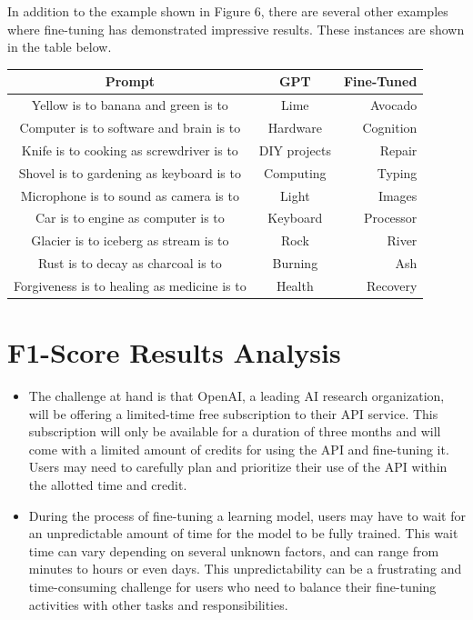 \documentclass[a0,landscape]{a0poster}
\begin{document}
\begin{multicols}{4}
In addition to the example shown in Figure 6, there are several other examples where fine-tuning has demonstrated impressive results. These instances are shown in the table below.

 \begin{center}\vspace{1cm}
\centering
\begin{tabular}{c|c|r}
\toprule
\textbf{Prompt}  &  \textbf{GPT}  & \textbf{Fine-Tuned} \\
\midrule
Yellow is to banana and green is to  &    Lime  & Avocado\\ \hline
Computer is to software and brain is to   &   Hardware   & Cognition\\ \hline
Knife is to cooking as screwdriver is to  &   DIY projects  & Repair \\ \hline
Shovel is to gardening as keyboard is to &   Computing   & Typing\\ \hline
Microphone is to sound as camera is to &    Light  & Images\\ \hline
Car is to engine as computer is to &   Keyboard   & Processor\\ \hline
Glacier is to iceberg as stream is to &   Rock   & River \\ \hline
Rust is to decay as charcoal is to &   Burning   & Ash\\ \hline
Forgiveness is to healing as medicine is to &   Health    & Recovery \\ \hline
\bottomrule
\end{tabular}
\end{center}\vspace{1cm}

\color{Teal}
\section*{F1-Score Results Analysis}
\color{Black}


\begin{itemize}
  \item The challenge at hand is that OpenAI, a leading AI research organization, will be offering a limited-time free subscription to their API service. This subscription will only be available for a duration of three months and will come with a limited amount of credits for using the API and fine-tuning it. Users may need to carefully plan and prioritize their use of the API within the allotted time and credit. 
  \item During the process of fine-tuning a learning model, users may have to wait for an unpredictable amount of time for the model to be fully trained. This wait time can vary depending on several unknown factors, and can range from minutes to hours or even days. This unpredictability can be a frustrating and time-consuming challenge for users who need to balance their fine-tuning activities with other tasks and responsibilities.
\end{itemize}




\end{multicols}
\end{document}
